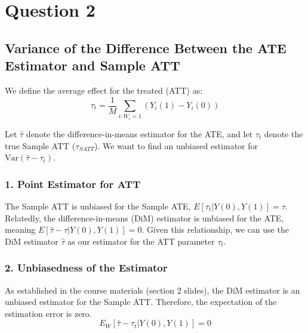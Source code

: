 \documentclass[12pt]{article}
\begin{document}
\section{Question 2}

\subsection{Variance of the Difference Between the ATE Estimator and Sample ATT}

We define the average effect for the treated (ATT) as:
$$
\tau_t = \frac{1}{M}\sum_{i: W_i=1} (Y_i(1) - Y_i(0))
$$

Let $\hat{\tau}$ denote the difference-in-means estimator for the ATE, and let $\tau_t$ denote the true Sample ATT ($\tau_{SATT}$). We want to find an unbiased estimator for $\text{Var}(\hat{\tau} - \tau_t)$.

\subsubsection*{1. Point Estimator for ATT}
The Sample ATT is unbiased for the Sample ATE, $E[\tau_t | Y(0), Y(1)] = \tau$. Relatedly, the difference-in-means (DiM) estimator is unbiased for the ATE, meaning $E[\hat{\tau} - \tau | Y(0), Y(1)] = 0$. Given this relationship, we can use the DiM estimator $\hat{\tau}$ as our estimator for the ATT parameter $\tau_t$.

\subsubsection*{2. Unbiasedness of the Estimator}
As established in the course materials (section 2 slides), the DiM estimator is an unbiased estimator for the Sample ATT. Therefore, the expectation of the estimation error is zero.
$$
E_W[\hat{\tau} - \tau_t | Y(0), Y(1)] = 0
$$
\end{document}
